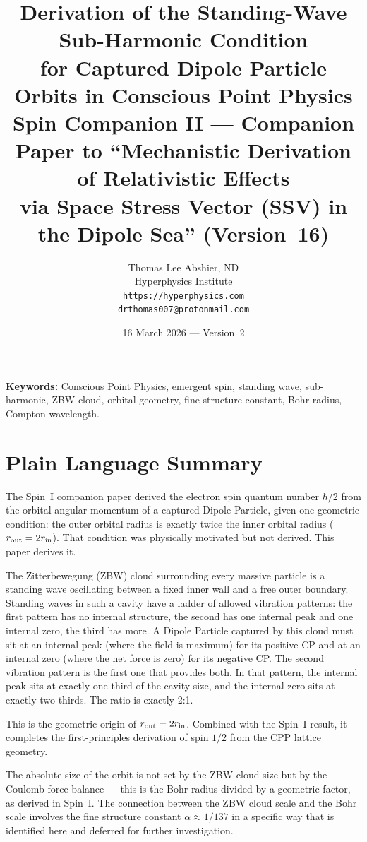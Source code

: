 \documentclass[12pt]{article}
\title{\textbf{Derivation of the Standing-Wave Sub-Harmonic Condition\\
for Captured Dipole Particle Orbits in Conscious Point Physics}\\[6pt]
{\large Spin Companion II ---
Companion Paper to ``Mechanistic Derivation of Relativistic Effects\\
via Space Stress Vector (SSV) in the Dipole Sea'' (Version~16)}}
\author{Thomas Lee Abshier, ND\\
Hyperphysics Institute\\
\texttt{https://hyperphysics.com}\\
\texttt{drthomas007@protonmail.com}}
\date{16 March 2026 --- Version~2}
\newcommand{\rin}{r_{\rm in}}
\newcommand{\rout}{r_{\rm out}}
\begin{document}
\maketitle

\noindent\textbf{Keywords:} Conscious Point Physics, emergent spin,
standing wave, sub-harmonic, ZBW cloud, orbital geometry, fine structure
constant, Bohr radius, Compton wavelength.

\section*{Plain Language Summary}

The Spin~I companion paper derived the electron spin quantum number
$\hbar/2$ from the orbital angular momentum of a captured Dipole
Particle, given one geometric condition: the outer orbital radius is
exactly twice the inner orbital radius ($\rout = 2\rin$).  That
condition was physically motivated but not derived.  This paper
derives it.

The Zitterbewegung (ZBW) cloud surrounding every massive particle is
a standing wave oscillating between a fixed inner wall and a free outer
boundary.  Standing waves in such a cavity have a ladder of allowed
vibration patterns: the first pattern has no internal structure, the
second has one internal peak and one internal zero, the third has more.
A Dipole Particle captured by this cloud must sit at an internal peak
(where the field is maximum) for its positive CP and at an internal
zero (where the net force is zero) for its negative CP.  The second
vibration pattern is the first one that provides both.  In that pattern,
the internal peak sits at exactly one-third of the cavity size, and the
internal zero sits at exactly two-thirds.  The ratio is exactly 2:1.

This is the geometric origin of $\rout = 2\rin$.  Combined with the
Spin~I result, it completes the first-principles derivation of spin
$1/2$ from the CPP lattice geometry.

The absolute size of the orbit is not set by the ZBW cloud size
but by the Coulomb force balance --- this is the Bohr radius divided
by a geometric factor, as derived in Spin~I.  The connection between
the ZBW cloud scale and the Bohr scale involves the fine structure
constant $\alpha \approx 1/137$ in a specific way that is identified
here and deferred for further investigation.
\end{document}
